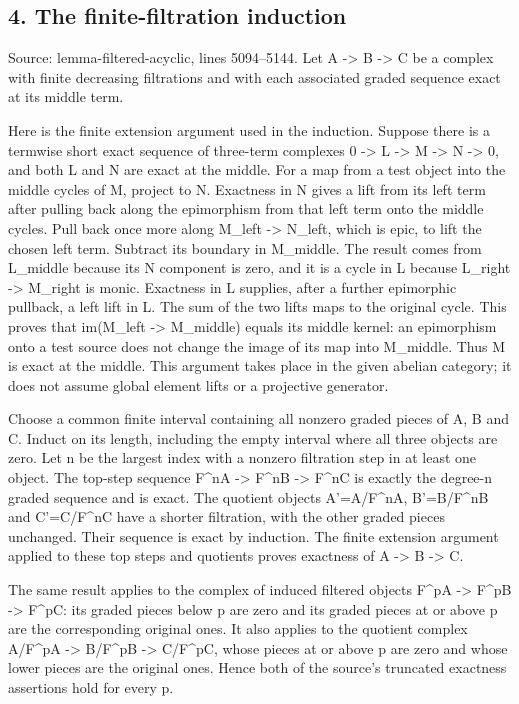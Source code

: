 \subsection{4. The finite-filtration induction}\label{note-05-the-finite-filtration-induction}

Source: lemma-filtered-acyclic, lines 5094--5144. Let A -\textgreater{} B -\textgreater{} C be a complex with finite decreasing filtrations and with each associated graded sequence exact at its middle term.

Here is the finite extension argument used in the induction. Suppose there is a termwise short exact sequence of three-term complexes 0 -\textgreater{} L -\textgreater{} M -\textgreater{} N -\textgreater{} 0, and both L and N are exact at the middle. For a map from a test object into the middle cycles of M, project to N. Exactness in N gives a lift from its left term after pulling back along the epimorphism from that left term onto the middle cycles. Pull back once more along M\_left -\textgreater{} N\_left, which is epic, to lift the chosen left term. Subtract its boundary in M\_middle. The result comes from L\_middle because its N component is zero, and it is a cycle in L because L\_right -\textgreater{} M\_right is monic. Exactness in L supplies, after a further epimorphic pullback, a left lift in L. The sum of the two lifts maps to the original cycle. This proves that im(M\_left -\textgreater{} M\_middle) equals its middle kernel: an epimorphism onto a test source does not change the image of its map into M\_middle. Thus M is exact at the middle. This argument takes place in the given abelian category; it does not assume global element lifts or a projective generator.

Choose a common finite interval containing all nonzero graded pieces of A, B and C. Induct on its length, including the empty interval where all three objects are zero. Let n be the largest index with a nonzero filtration step in at least one object. The top-step sequence F\^{}nA -\textgreater{} F\^{}nB -\textgreater{} F\^{}nC is exactly the degree-n graded sequence and is exact. The quotient objects A'=A/F\^{}nA, B'=B/F\^{}nB and C'=C/F\^{}nC have a shorter filtration, with the other graded pieces unchanged. Their sequence is exact by induction. The finite extension argument applied to these top steps and quotients proves exactness of A -\textgreater{} B -\textgreater{} C.

The same result applies to the complex of induced filtered objects F\^{}pA -\textgreater{} F\^{}pB -\textgreater{} F\^{}pC: its graded pieces below p are zero and its graded pieces at or above p are the corresponding original ones. It also applies to the quotient complex A/F\^{}pA -\textgreater{} B/F\^{}pB -\textgreater{} C/F\^{}pC, whose pieces at or above p are zero and whose lower pieces are the original ones. Hence both of the source's truncated exactness assertions hold for every p.

